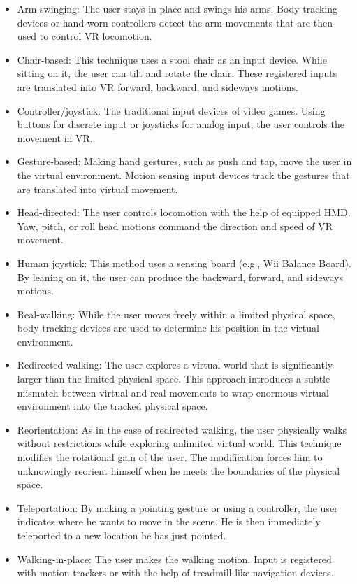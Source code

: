 \begin{itemize}
\item Arm swinging: The user stays in place and swings his arms. Body tracking devices or hand-worn controllers detect the arm movements that are then used to control VR locomotion.
\item Chair-based: This technique uses a stool chair as an input device. While sitting on it, the user can tilt and rotate the chair. These registered inputs are translated into VR forward, backward, and sideways motions.
\item Controller/joystick: The traditional input devices of video games. Using buttons for discrete input or joysticks for analog input, the user controls the movement in VR.
\item Gesture-based: Making hand gestures, such as push and tap, move the user in the virtual environment. Motion sensing input devices track the gestures that are translated into virtual movement.
\item Head-directed: The user controls locomotion with the help of equipped HMD. Yaw, pitch, or roll head motions command the direction and speed of VR movement.
\item Human joystick: This method uses a sensing board (e.g., Wii Balance Board). By leaning on it, the user can produce the backward, forward, and sideways motions.
\item Real-walking: While the user moves freely within a limited physical space, body tracking devices are used to determine his position in the virtual environment.
\item Redirected walking: The user explores a virtual world that is significantly larger than the limited physical space. This approach introduces a subtle mismatch between virtual and real movements to wrap enormous virtual environment into the tracked physical space.
\item Reorientation: As in the case of redirected walking, the user physically walks without restrictions while exploring unlimited virtual world. This technique modifies the rotational gain of the user. The modification forces him to unknowingly reorient himself when he meets the boundaries of the physical space.
\item Teleportation: By making a pointing gesture or using a controller, the user indicates where he wants to move in the scene. He is then immediately teleported to a new location he has just pointed.
\item Walking-in-place: The user makes the walking motion. Input is registered with motion trackers or with the help of treadmill-like navigation devices.
\end{itemize}

